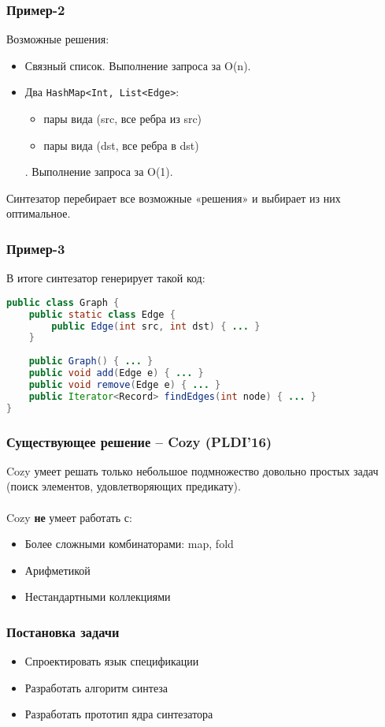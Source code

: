 \documentclass[14pt]{beamer}
\begin{document}
\begin{frame}[fragile]
\frametitle{Пример-2}
Возможные решения:
\begin{itemize}
    \item Связный список. Выполнение запроса за O(n).
    \item Два \texttt{HashMap<Int, List<Edge>}:
    \begin{itemize}
        \item пары вида (src, все ребра из src)
        \item пары вида (dst, все ребра в dst)
    \end{itemize}.
    Выполнение запроса за O(1).
\end{itemize}
Синтезатор перебирает все возможные «решения» и выбирает из них оптимальное.
\end{frame}

\begin{frame}[fragile]
\frametitle{Пример-3}
В итоге синтезатор генерирует такой код:
\begin{lstlisting}[language=Java]
public class Graph {
    public static class Edge {
        public Edge(int src, int dst) { ... }
    }
    
    public Graph() { ... }
    public void add(Edge e) { ... }
    public void remove(Edge e) { ... }
    public Iterator<Record> findEdges(int node) { ... }
}
\end{lstlisting}

\end{frame}


\begin{frame}
\frametitle{Существующее решение -- Cozy (PLDI'16)}
Cozy умеет решать только небольшое подмножество довольно простых задач (поиск элементов, удовлетворяющих предикату).\\ \\
Cozy \textbf{не} умеет работать с:
\begin{itemize}
\item Более сложными комбинаторами: map, fold
\item Арифметикой
\item Нестандартными коллекциями
\end{itemize}
\end{frame}


\begin{frame}
\frametitle{Постановка задачи}
\begin{itemize}
    \item Спроектировать язык спецификации
    \item Разработать алгоритм синтеза
    \item Разработать прототип ядра синтезатора
\end{itemize}
\end{frame}
\end{document}
